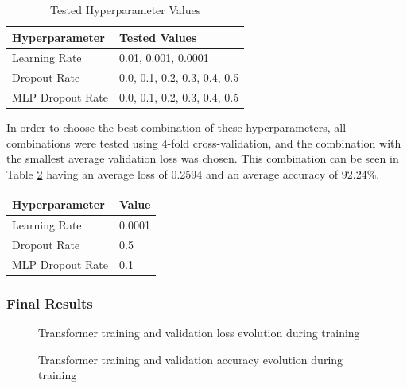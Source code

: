 \begin{table}[H]
\caption{Tested Hyperparameter Values}
\label{table:transformer_hyperparameters}
\centering
\begin{tabular}{|l|l|}
\hline
Hyperparameter & Tested Values\\
\hline
Learning Rate & 0.01, 0.001, 0.0001\\
\hline
Dropout Rate & 0.0, 0.1, 0.2, 0.3, 0.4, 0.5\\
\hline
MLP Dropout Rate & 0.0, 0.1, 0.2, 0.3, 0.4, 0.5\\
\hline
\end{tabular}
\end{table}

In order to choose the best combination of these hyperparameters, all combinations were
tested using 4-fold cross-validation, and the combination with the smallest average validation loss was chosen. This combination can be seen in Table \ref{table:transformer_best_hyperparameters}
having an average loss of 0.2594 and an average accuracy of 92.24\%.

\begin{table}[H]
\label{table:transformer_best_hyperparameters}
\centering
\begin{tabular}{|l|l|}
\hline
Hyperparameter & Value \\
\hline
Learning Rate & 0.0001 \\
\hline
Dropout Rate & 0.5 \\
\hline
MLP Dropout Rate & 0.1 \\
\hline
\end{tabular}
\end{table}

\subsubsection{Final Results}

\begin{figure}[H]
\centerline{}
\caption[Transformer training and validation loss evolution during training]{Transformer training and validation loss evolution during training}
\label{fig:transformer_loss}
\end{figure}

\begin{figure}[H]
\centerline{}
\caption[Transformer training and validation accuracy evolution during training]{Transformer training and validation accuracy evolution during training}
\label{fig:transformer_acc}
\end{figure}

